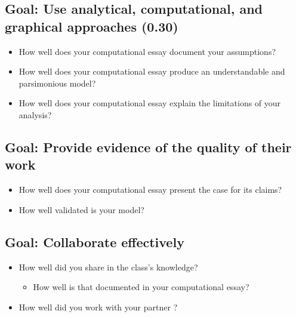 \documentclass[letterpaper,10pt,english]{jupyterBook}
\begin{document}
\subsection{Goal: Use analytical, computational, and graphical approaches (0.30)}
\label{\detokenize{content/1_mechanics/ODE_games:goal-use-analytical-computational-and-graphical-approaches-0-30}}\begin{itemize}
\item {} 
\sphinxAtStartPar
How well does your computational essay document your assumptions?

\item {} 
\sphinxAtStartPar
How well does your computational essay produce an understandable and parsimonious model?

\item {} 
\sphinxAtStartPar
How well does your computational essay explain the limitations of your analysis?

\end{itemize}


\subsection{Goal: Provide evidence of the quality of their work}
\label{\detokenize{content/1_mechanics/ODE_games:goal-provide-evidence-of-the-quality-of-their-work}}\begin{itemize}
\item {} 
\sphinxAtStartPar
How well does your computational essay present  the case for its claims?

\item {} 
\sphinxAtStartPar
How well validated  is your model?

\end{itemize}


\subsection{Goal: Collaborate effectively}
\label{\detokenize{content/1_mechanics/ODE_games:goal-collaborate-effectively}}\begin{itemize}
\item {} 
\sphinxAtStartPar
How well did you share  in the class’s knowledge?
\begin{itemize}
\item {} 
\sphinxAtStartPar
How well is that documented in your computational essay?

\end{itemize}

\item {} 
\sphinxAtStartPar
How well did you work with your partner ? 

\end{itemize}
\end{document}
